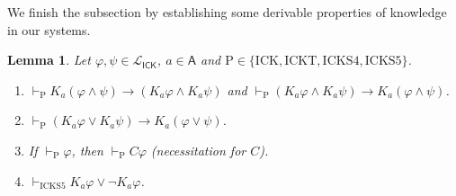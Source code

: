 \documentclass{myifcolog}
\newcommand\C {C}
\newcommand{\K}{K}
\newcommand\A{\mathsf{A}}
\newcommand{\agi}{a}
\newcommand{\ICK}{\mathsf{ICK}}
\newcommand{\LICK}{\mathcal{L}_{\ICK}}
\newcommand{\hick}{\mathrm{ICK}}
\newcommand{\hickt}{\mathrm{ICKT}}
\newcommand{\hicks}{\mathrm{ICKS4}}
\newcommand{\hickss}{\mathrm{ICKS5}}
\newcommand{\hickp}{\mathrm{P}}
\newtheorem{lemma}[theorem]{Lemma}
\numberwithin{theorem}{section}
\begin{document}
We finish the subsection by establishing some derivable properties of knowledge in our systems. 

\begin{lemma}\label{l: derivable formulae 2}
   Let $\varphi, \psi \in \LICK$, $\agi \in \A$ and $\hickp \in \{\hick, \hickt, \hicks, \hickss\}$.
   \begin{enumerate}
       \item\label{l: derivable formulae 2 item 1} $\vdash_{\hickp} \K_\agi (\varphi \wedge \psi) \rightarrow (\K_\agi \varphi \wedge \K_\agi \psi)$ and $\vdash_{\hickp} (\K_\agi \varphi \wedge \K_\agi \psi) \rightarrow \K_\agi (\varphi \wedge \psi)$.
    \item\label{l: derivable formulae 2 item 2} $\vdash_{\hickp} (\K_\agi \varphi \vee \K_\agi \psi) \rightarrow \K_\agi (\varphi \vee \psi)$.
    \item\label{l: derivable formulae 2 item 3} If $\vdash_{\hickp} \varphi$, then $\vdash_{\hickp} \C \varphi$ (necessitation for $\C$).
    \item\label{l: derivable formulae 2 item 4} $\vdash_{\hickss} K_\agi \varphi \vee \neg K_\agi \varphi$.
   \end{enumerate}
\end{lemma}
\end{document}
